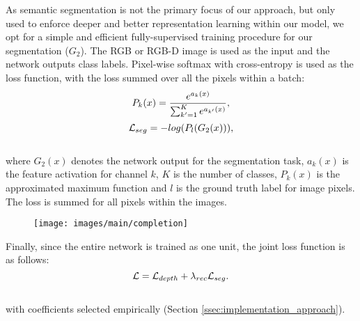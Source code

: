 \documentclass[10pt,twocolumn,letterpaper]{article}
\begin{document}
{As semantic segmentation is not the primary focus of our approach, but only used to enforce deeper and better representation learning within our model, we opt for a simple and efficient fully-supervised training procedure for our segmentation ($G_2$). The RGB or RGB-D image is used as the input and the network outputs class labels. Pixel-wise softmax with cross-entropy is used as the loss function, with the loss summed over all the pixels within a batch:\vspace{-0.15cm}\begin{equation}  
P_{k}(x)  = \frac{e^{a_{k}(x)}}{\sum_{k^{\prime}=1}^{K} e^{a_{k^{\prime}}(x)}},
\label{eq:seg_1}\vspace{0.1cm}
\end{equation}
\begin{equation}  
\mathcal{L}_{seg} = - log(P_{l}(G_{2}(x))),
\label{eq:seg_2}\vspace{-0.4cm}
\end{equation}\\
where $G_{2}(x)$ denotes the network output for the segmentation task, $a_{k}(x)$ is the feature activation for channel $k$, $K$ is the number of classes, $P_{k}(x)$ is the approximated maximum function and $l$ is the ground truth label for image pixels. The loss is summed for all pixels within the images.\begin{figure*}[t!]
	\centering
	\texttt{[image: images/main/completion]}
	\captionsetup[figure]{skip=7pt}
	\label{fig:completion}\vspace{-0.4cm}
\end{figure*}


Finally, since the entire network is trained as one unit, the joint loss function is as follows:\vspace{-0.1cm}\begin{equation}  
	\mathcal{L}  = \mathcal{L}_{depth} + \lambda_{rec}\mathcal{L}_{seg}.
	\label{lossFinal}\vspace{-0.45cm}
\end{equation}\\
with coefficients selected empirically (Section \ref{ssec:implementation_approach}).

}
\end{document}
